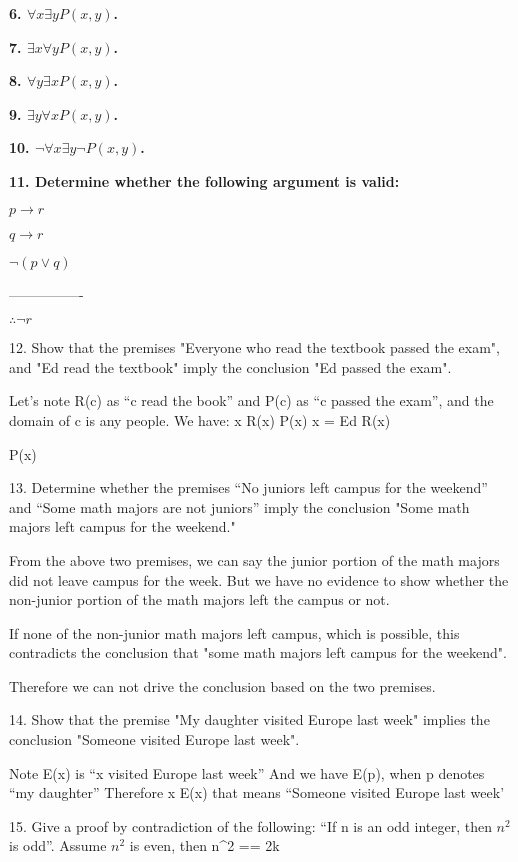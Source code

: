 \documentclass{article}
\begin{document}
\textbf{6. $\forall x \exists yP(x,y)$.}

\textbf{7. $\exists x \forall yP(x,y)$.}

\textbf{8. $\forall y \exists xP(x,y)$.}

\textbf{9. $\exists y \forall xP(x,y)$.}

\textbf{10. $\lnot \forall x \exists y \lnot P(x,y)$.}

\textbf{11. Determine whether the following argument is valid:}

\textbf{$p \to r$}

\textbf{$q \to r$}

\textbf{$\lnot (p \lor q)$}

----------------

$\therefore \lnot r$

12. Show that the premises "Everyone who read the textbook passed the exam", and "Ed read the textbook" imply the conclusion "Ed passed the exam".

Let's note R(c) as ``c read the book'' and P(c) as ``c passed the exam'', and the domain of c is any people.
We have:
\forall x R(x) \to P(x)
x = Ed
R(x)

\therefore P(x)

13. Determine whether the premises ``No juniors left campus for the weekend'' and ``Some math majors are not juniors'' imply the conclusion "Some math majors left campus for the weekend."

From the above two premises, we can say the junior portion of the math majors did not leave campus for the week. But we have no evidence to show whether the non-junior portion of the math majors left the campus or not.

If none of the non-junior math majors left campus, which is possible, this contradicts the conclusion that "some math majors left campus for the weekend". 

Therefore we can not drive the conclusion based on the two premises.

14. Show that the premise "My daughter visited Europe last week" implies the conclusion "Someone visited Europe last week".

Note E(x) is ``x visited Europe last week''
And we have E(p), when p denotes ``my daughter''
Therefore \exists x E(x) that means ``Someone visited Europe last week'

15. Give a proof by contradiction of the following: ``If n is an odd integer, then $n^2$ is odd''.
Assume $n^2$ is even, then n^2 == 2k
\end{document}
